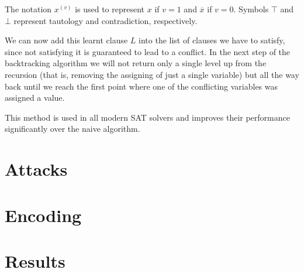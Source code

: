The notation $x^{(v)}$ is used to represent $x$ if $v=1$ and $\overline{x}$ if $v=0$. Symbols $\top$ and $\bot$ represent tautology and contradiction, respectively.

We can now add this learnt clause $L$ into the list of clauses we have to satisfy, since not satisfying it is guaranteed to lead to a conflict.
In the next step of the backtracking algorithm we will not return only a single level up from the recursion (that is, removing the assigning of just a single variable) but all the way back until we reach the first point where one of the conflicting variables was assigned a value.

This method is used in all modern SAT solvers and improves their performance significantly over the naive algorithm.


\chapter{Attacks}


\chapter{Encoding}


\chapter{Results}


